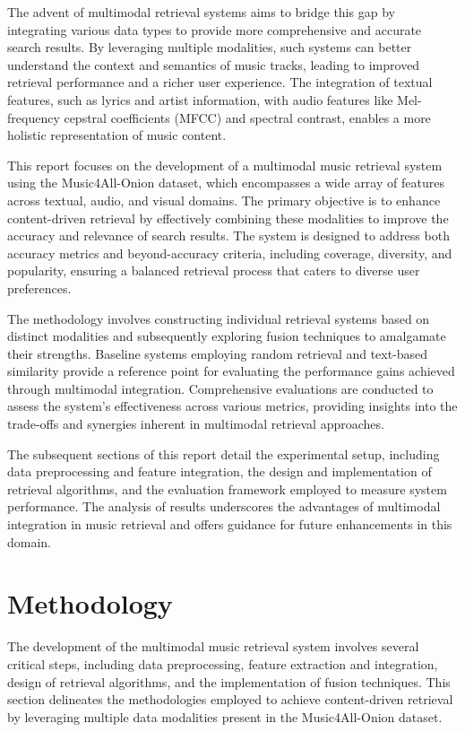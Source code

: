\documentclass[sigconf]{acmart}
\begin{document}
The advent of multimodal retrieval systems aims to bridge this gap by integrating various data types to provide more comprehensive and accurate search results. By leveraging multiple modalities, such systems can better understand the context and semantics of music tracks, leading to improved retrieval performance and a richer user experience. The integration of textual features, such as lyrics and artist information, with audio features like Mel-frequency cepstral coefficients (MFCC) and spectral contrast, enables a more holistic representation of music content.

This report focuses on the development of a multimodal music retrieval system using the Music4All-Onion dataset, which encompasses a wide array of features across textual, audio, and visual domains. The primary objective is to enhance content-driven retrieval by effectively combining these modalities to improve the accuracy and relevance of search results. The system is designed to address both accuracy metrics and beyond-accuracy criteria, including coverage, diversity, and popularity, ensuring a balanced retrieval process that caters to diverse user preferences.

The methodology involves constructing individual retrieval systems based on distinct modalities and subsequently exploring fusion techniques to amalgamate their strengths. Baseline systems employing random retrieval and text-based similarity provide a reference point for evaluating the performance gains achieved through multimodal integration. Comprehensive evaluations are conducted to assess the system's effectiveness across various metrics, providing insights into the trade-offs and synergies inherent in multimodal retrieval approaches.

The subsequent sections of this report detail the experimental setup, including data preprocessing and feature integration, the design and implementation of retrieval algorithms, and the evaluation framework employed to measure system performance. The analysis of results underscores the advantages of multimodal integration in music retrieval and offers guidance for future enhancements in this domain.

\section{Methodology}
\label{sec:methodology}

The development of the multimodal music retrieval system involves several critical steps, including data preprocessing, feature extraction and integration, design of retrieval algorithms, and the implementation of fusion techniques. This section delineates the methodologies employed to achieve content-driven retrieval by leveraging multiple data modalities present in the Music4All-Onion dataset.
\end{document}
